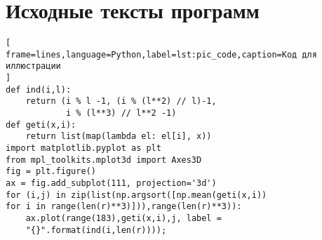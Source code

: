 \chapter{Исходные тексты программ}\label{code}

\begin{lstlisting}[
frame=lines,language=Python,label=lst:pic_code,caption=Код для иллюстрации
]
def ind(i,l):
    return (i % l -1, (i % (l**2) // l)-1,
            i % (l**3) // l**2 -1)	
def geti(x,i):
    return list(map(lambda el: el[i], x))		
import matplotlib.pyplot as plt
from mpl_toolkits.mplot3d import Axes3D
fig = plt.figure()
ax = fig.add_subplot(111, projection='3d')	
for (i,j) in zip(list(np.argsort([np.mean(geti(x,i)) 
for i in range(len(r)**3)])),range(len(r)**3)):
    ax.plot(range(183),geti(x,i),j, label =
    "{}".format(ind(i,len(r))));
\end{lstlisting}
